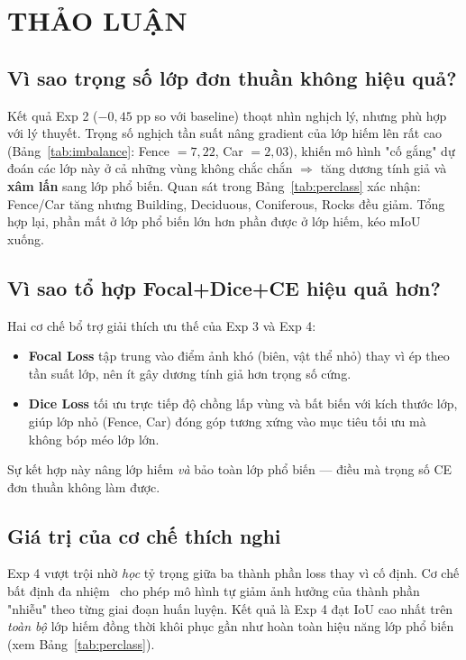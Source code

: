 \chapter{THẢO LUẬN}
\label{ch:thao_luan}

\section{Vì sao trọng số lớp đơn thuần không hiệu quả?}

Kết quả Exp 2 ($-0{,}45$ pp so với baseline) thoạt nhìn nghịch lý, nhưng phù hợp với
lý thuyết. Trọng số nghịch tần suất nâng gradient của lớp hiếm lên rất cao
(Bảng~\ref{tab:imbalance}: Fence $= 7{,}22$, Car $= 2{,}03$), khiến mô hình "cố gắng"
dự đoán các lớp này ở cả những vùng không chắc chắn $\Rightarrow$ tăng dương tính giả
và \textbf{xâm lấn} sang lớp phổ biến. Quan sát trong Bảng~\ref{tab:perclass} xác
nhận: Fence/Car tăng nhưng Building, Deciduous, Coniferous, Rocks đều giảm. Tổng hợp
lại, phần mất ở lớp phổ biến lớn hơn phần được ở lớp hiếm, kéo mIoU xuống.

\section{Vì sao tổ hợp Focal+Dice+CE hiệu quả hơn?}

Hai cơ chế bổ trợ giải thích ưu thế của Exp 3 và Exp 4:
\begin{itemize}[leftmargin=1.4cm]
  \item \textbf{Focal Loss} tập trung vào điểm ảnh khó (biên, vật thể nhỏ) thay vì
  ép theo tần suất lớp, nên ít gây dương tính giả hơn trọng số cứng.
  \item \textbf{Dice Loss} tối ưu trực tiếp độ chồng lấp vùng và bất biến với kích
  thước lớp, giúp lớp nhỏ (Fence, Car) đóng góp tương xứng vào mục tiêu tối ưu mà
  không bóp méo lớp lớn.
\end{itemize}
Sự kết hợp này nâng lớp hiếm \emph{và} bảo toàn lớp phổ biến --- điều mà trọng số CE
đơn thuần không làm được.

\section{Giá trị của cơ chế thích nghi}

Exp 4 vượt trội nhờ \emph{học} tỷ trọng giữa ba thành phần loss thay vì cố định. Cơ
chế bất định đa nhiệm~\cite{kendall2018uncertainty} cho phép mô hình tự giảm ảnh
hưởng của thành phần "nhiễu" theo từng giai đoạn huấn luyện. Kết quả là Exp 4 đạt IoU
cao nhất trên \emph{toàn bộ} lớp hiếm đồng thời khôi phục gần như hoàn toàn hiệu năng
lớp phổ biến (xem Bảng~\ref{tab:perclass}).

